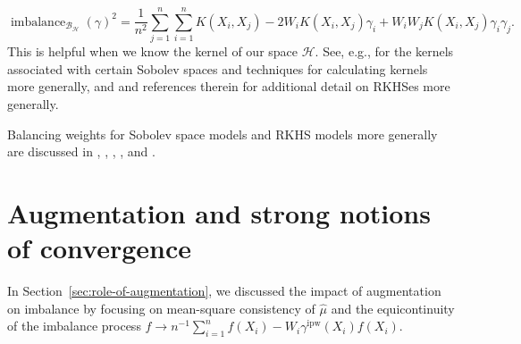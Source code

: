 \documentclass{article}
\theoremstyle{definition}
\newcommand{\calB}{\ensuremath{\mathcal{B}}}
\newcommand{\calH}{\ensuremath{\mathcal{H}}}
\newcommand{\ipw}{\text{ipw}}
\DeclareMathOperator{\imbalance}{imbalance}
\newcommand{\gammaipw}{\ensuremath{\gamma^{\ipw}}}
\newcommand{\<}{\langle}
\renewcommand{\>}{\rangle}
\begin{document}
\begin{refsection}
\begin{equation}
\label{eq:imbalance_rkhs}
\imbalance_{\calB_\calH}(\gamma)^2 = \frac{1}{n^2}\sum_{j=1}^n \sum_{i=1}^n K(X_i,X_j) - 2 W_i K(X_i,X_j) \gamma_i +  W_iW_j K(X_i,X_j) \gamma_i\gamma_j.
\end{equation}
\noindent This is helpful when we know the kernel of our space $\calH$.
See, e.g., \citet{novak2018reproducing} for the kernels associated with
certain Sobolev spaces and techniques for calculating kernels more generally,
and \citet[Section 2.3]{hirshberg2019minimax} and references therein for additional detail on RKHSes more generally.


Balancing weights for Sobolev space models and RKHS models more generally are discussed in \citet{Hazlett2019}, \citet{hirshberg2019minimax}, \citet{kallus2020generalized}, \citet{singh2020reproducing}, and \citet{wong2018kernel}.


\section{Augmentation and strong notions of convergence}
\label{sec:strong-norm-consistency}

In Section~\ref{sec:role-of-augmentation}, we discussed the impact of augmentation on
imbalance by focusing on mean-square consistency of $\hat \mu$ and the equicontinuity of
the imbalance process $f \to n^{-1}\sum_{i=1}^n f(X_i) - W_i \gammaipw(X_i) f(X_i)$.


\end{refsection}
\end{document}
